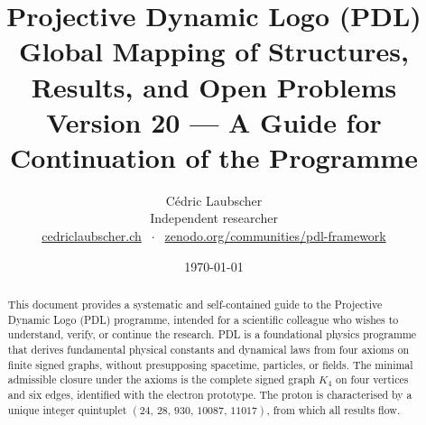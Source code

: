 \documentclass[11pt,a4paper]{article}
\title{Projective Dynamic Logo (PDL)\\[4pt]
\large Global Mapping of Structures, Results, and Open Problems\\[2pt]
\normalsize Version 20 --- A Guide for Continuation of the Programme}
\author{C\'edric Laubscher\\[4pt]
\small Independent researcher\\
\small \href{https://cedriclaubscher.ch}{cedriclaubscher.ch}
$\;\cdot\;$
\small \href{https://zenodo.org/communities/pdl-framework/}{zenodo.org/communities/pdl-framework}}
\date{\today}
\theoremstyle{plain}
\theoremstyle{definition}
\theoremstyle{remark}
\newcommand{\Kfour}{K_4}
\newcommand{\quintuplet}{(24,\,28,\,930,\,10087,\,11017)}
\begin{document}
\maketitle
\setcounter{tocdepth}{2}

\begin{abstract}
This document provides a systematic and self-contained guide to the Projective Dynamic Logo (PDL) programme, intended for a scientific colleague who wishes to understand, verify, or continue the research. PDL is a foundational physics programme that derives fundamental physical constants and dynamical laws from four axioms on finite signed graphs, without presupposing spacetime, particles, or fields. The minimal admissible closure under the axioms is the complete signed graph $\Kfour$ on four vertices and six edges, identified with the electron prototype. The proton is characterised by a unique integer quintuplet $\quintuplet$, from which all results flow.


\end{abstract}
\end{document}
